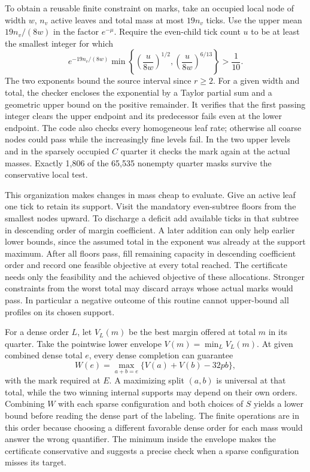 To obtain a reusable finite constraint on marks, take an occupied local node of width \(w\), \(n_v\) active leaves and total mass at most \(19n_v\) ticks. Use the upper mean \(19n_v/(8w)\) in the factor \(e^{-\mu}\). Require the even-child tick count \(u\) to be at least the smallest integer for which
\[
         e^{-19n_v/(8w)}
         \min\left\{\left(\frac{u}{8w}\right)^{1/2},
                    \left(\frac{u}{8w}\right)^{6/13}\right\}>\frac1{10}.
\]
The two exponents bound the source interval since \(r\ge2\). For a given width and total, the checker encloses the exponential by a Taylor partial sum and a geometric upper bound on the positive remainder. It verifies that the first passing integer clears the upper endpoint and its predecessor fails even at the lower endpoint. The code also checks every homogeneous leaf rate; otherwise all coarse nodes could pass while the increasingly fine levels fail. In the two upper levels and in the sparsely occupied \(C\) quarter it checks the mark again at the actual masses. Exactly 1,806 of the 65,535 nonempty quarter masks survive the conservative local test.

This organization makes changes in mass cheap to evaluate. Give an active leaf one tick to retain its support. Visit the mandatory even-subtree floors from the smallest nodes upward. To discharge a deficit add available ticks in that subtree in descending order of margin coefficient. A later addition can only help earlier lower bounds, since the assumed total in the exponent was already at the support maximum. After all floors pass, fill remaining capacity in descending coefficient order and record one feasible objective at every total reached. The certificate needs only the feasibility and the achieved objective of these allocations. Stronger constraints from the worst total may discard arrays whose actual marks would pass. In particular a negative outcome of this routine cannot upper-bound all profiles on its chosen support.

For a dense order \(L\), let \(V_L(m)\) be the best margin offered at total \(m\) in its quarter. Take the pointwise lower envelope \(V(m)=\min_L V_L(m)\). At given combined dense total \(e\), every dense completion can guarantee
\[
  W(e)=\max_{a+b=e}\{V(a)+V(b)-32pb\},
\]
with the mark required at \(E\). A maximizing split \((a,b)\) is universal at that total, while the two winning internal supports may depend on their own orders. Combining \(W\) with each sparse configuration and both choices of \(S\) yields a lower bound before reading the dense part of the labeling. The finite operations are in this order because choosing a different favorable dense order for each mass would answer the wrong quantifier. The minimum inside the envelope makes the certificate conservative and suggests a precise check when a sparse configuration misses its target.

